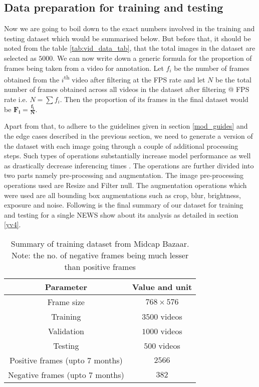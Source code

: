 \subsection{Data preparation for training and testing} \label{train_test}
Now we are going to boil down to the exact numbers involved in the training and testing dataset which would be summarised below. But before that, it should be noted from the table \ref{tab:vid_data_tab}, that the total images in the dataset are selected as $5000$. We can now write down a generic formula for the proportion of frames being taken from a video for annotation. Let $f_i$ be the number of frames obtained from the $i$\textsuperscript{th} video after filtering at the FPS rate and let $N$ be the total number of frames obtained across all videos in the dataset after filtering @ FPS rate i.e. $N = \sum f_{i}$. Then the proportion of its frames in the final dataset would be $\boldsymbol{F_{i} = \frac{f_{i}}{N}}$. \par

Apart from that, to adhere to the guidelines given in section \ref{mod_guides} and the edge cases described in the previous section, we need to generate a version of the dataset with each image going through a couple of additional processing steps. Such types of operations substantially increase model performance as well as drastically decrease inferencing times \cite{Joseph2021} \cite{Dwyer2020}. The operations are further divided into two parts namely pre-processing and augmentation.  The image pre-processing operations used are Resize and Filter null. The augmentation operations which were used are all bounding box augmentations such as crop, blur, brightness, exposure and noise. Following is the final summary of our dataset for training and testing for a single NEWS show about its analysis as detailed in section \ref{yv4}.

\begin{table}[h]
 \def\arraystretch{1.5}
 \centering
 \caption{Summary of training dataset from Midcap Bazaar. Note: the no. of negative frames being much lesser than positive frames}
 \begin{tabular}{|c|c|}
  \hline
  Parameter & Value and unit \\
  \hline
  Frame size & $768 \times 576$                    \\
  \hline
  Training & $3500$ videos                   \\
  \hline
  Validation & $1000$ videos                 \\
  \hline
  Testing & $500$ videos                   \\
  \hline
  Positive frames (upto $7$ months) & $2566$                   \\
  \hline
  Negative frames (upto $7$ months) & $382$                   \\
  \hline
 \end{tabular}
 \label{tab:vid_train}
\end{table}

